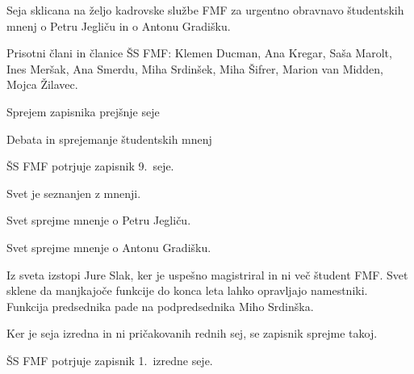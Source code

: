 \documentclass{seja}
\begin{document}
Seja sklicana na željo kadrovske službe FMF za urgentno obravnavo študentskih
mnenj o Petru Jegliču in o Antonu Gradišku.

Prisotni člani in članice ŠS FMF: Klemen Ducman, Ana Kregar, Saša Marolt, Ines Meršak, Ana Smerdu,
Miha Srdinšek, Miha Šifrer, Marion van Midden, Mojca Žilavec.

\begin{red*}
\item Sprejem zapisnika prejšnje seje
\item Debata in sprejemanje študentskih mnenj
\end{red*}

\begin{ad}
\item
\begin{sklep*}
  ŠS FMF potrjuje zapisnik 9.~seje.
\end{sklep*}

\item
Svet je seznanjen z mnenji.

\begin{sklep*}
Svet sprejme mnenje o Petru Jegliču.
\end{sklep*}
\begin{sklep*}
Svet sprejme mnenje o Antonu Gradišku.
\end{sklep*}

\item Iz sveta izstopi Jure Slak, ker je uspešno magistriral in ni več študent FMF. Svet sklene da manjkajoče funkcije do konca leta lahko opravljajo namestniki.
Funkcija predsednika pade na podpredsednika Miho Srdinška.

Ker je seja izredna in ni pričakovanih rednih sej, se zapisnik sprejme takoj.
\begin{sklep*}
  ŠS FMF potrjuje zapisnik 1.~izredne seje.
\end{sklep*}
\end{ad}

\makeatletter \global\let\@enddocumenthook\@empty \makeatother
{}
\end{document}
